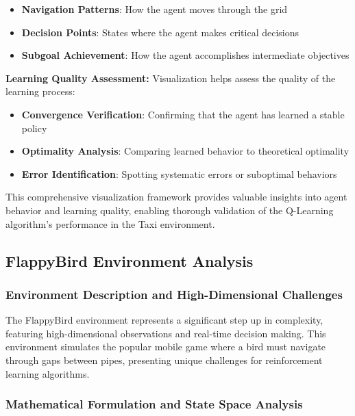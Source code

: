 \documentclass[12pt]{article}
\begin{document}
{{{\begin{itemize}
    \item \textbf{Navigation Patterns}: How the agent moves through the grid
    \item \textbf{Decision Points}: States where the agent makes critical decisions
    \item \textbf{Subgoal Achievement}: How the agent accomplishes intermediate objectives
\end{itemize}

\textbf{Learning Quality Assessment:}
Visualization helps assess the quality of the learning process:

\begin{itemize}
    \item \textbf{Convergence Verification}: Confirming that the agent has learned a stable policy
    \item \textbf{Optimality Analysis}: Comparing learned behavior to theoretical optimality
    \item \textbf{Error Identification}: Spotting systematic errors or suboptimal behaviors
\end{itemize}

This comprehensive visualization framework provides valuable insights into agent behavior and learning quality, enabling thorough validation of the Q-Learning algorithm's performance in the Taxi environment.

\subsection{FlappyBird Environment Analysis}

\subsubsection{Environment Description and High-Dimensional Challenges}

The FlappyBird environment represents a significant step up in complexity, featuring high-dimensional observations and real-time decision making. This environment simulates the popular mobile game where a bird must navigate through gaps between pipes, presenting unique challenges for reinforcement learning algorithms.

\subsubsection{Mathematical Formulation and State Space Analysis}

}}}
\end{document}
